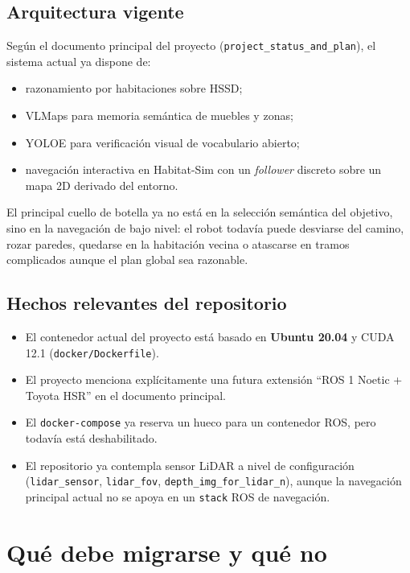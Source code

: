 \documentclass[11pt,a4paper]{article}
\begin{document}
\subsection{Arquitectura vigente}

Según el documento principal del proyecto (\texttt{project\_status\_and\_plan}),
el sistema actual ya dispone de:

\begin{itemize}
  \item razonamiento por habitaciones sobre HSSD;
  \item VLMaps para memoria semántica de muebles y zonas;
  \item YOLOE para verificación visual de vocabulario abierto;
  \item navegación interactiva en Habitat-Sim con un \textit{follower} discreto
        sobre un mapa 2D derivado del entorno.
\end{itemize}

El principal cuello de botella ya no está en la selección semántica del
objetivo, sino en la navegación de bajo nivel: el robot todavía puede desviarse
del camino, rozar paredes, quedarse en la habitación vecina o atascarse en
tramos complicados aunque el plan global sea razonable.

\subsection{Hechos relevantes del repositorio}

\begin{itemize}
  \item El contenedor actual del proyecto está basado en
        \textbf{Ubuntu 20.04} y CUDA 12.1
        (\texttt{docker/Dockerfile}).
  \item El proyecto menciona explícitamente una futura extensión
        ``ROS 1 Noetic + Toyota HSR'' en el documento principal.
  \item El \texttt{docker-compose} ya reserva un hueco para un contenedor ROS,
        pero todavía está deshabilitado.
  \item El repositorio ya contempla sensor LiDAR a nivel de configuración
        (\texttt{lidar\_sensor}, \texttt{lidar\_fov}, \texttt{depth\_img\_for\_lidar\_n}),
        aunque la navegación principal actual no se apoya en un \texttt{stack}
        ROS de navegación.
\end{itemize}

\section{Qué debe migrarse y qué no}
\end{document}

